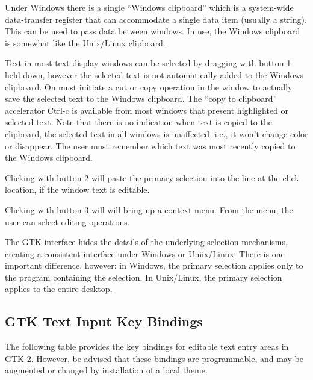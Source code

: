 Under Windows there is a single ``Windows clipboard'' which is a
system-wide data-transfer register that can accommodate a single data
item (usually a string).  This can be used to pass data between
windows.  In use, the Windows clipboard is somewhat like the
Unix/Linux clipboard.
 
Text in most text display windows can be selected by dragging with
button 1 held down, however the selected text is not automatically
added to the Windows clipboard.  On must initiate a {\cb cut} or {\cb
copy} operation in the window to actually save the selected text to
the Windows clipboard.  The ``copy to clipboard'' accelerator
{\kb Ctrl-c} is available from most windows that present highlighted
or selected text.  Note that there is no indication when text is
copied to the clipboard, the selected text in all windows is
unaffected, i.e., it won't change color or disappear.  The user must
remember which text was most recently copied to the Windows clipboard.

Clicking with button 2 will paste the primary selection into the line
at the click location, if the window text is editable.

Clicking with button 3 will will bring up a context menu.  From the
menu, the user can select editing operations.

The GTK interface hides the details of the underlying selection
mechanisms, creating a consistent interface under Windows or
Uniix/Linux.  There is one important difference, however:  in Windows,
the primary selection applies only to the program containing the
selection.  In Unix/Linux, the primary selection applies to the entire
desktop,


\subsection{GTK Text Input Key Bindings}
\label{textkeybind}

The following table provides the key bindings for editable text entry
areas in GTK-2.  However, be advised that these bindings are
programmable, and may be augmented or changed by installation of a
local theme.

